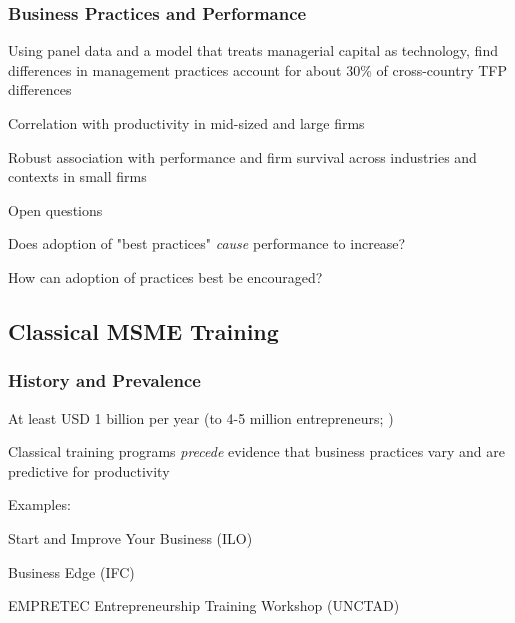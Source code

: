 \documentclass[hideothersubsections, usenames,dvipsnames,11pt]{beamer}
\newenvironment{itemize_2pt}{\itemize\addtolength{\itemsep}{2pt}}{\enditemize}
\begin{document}
\begin{frame}
\frametitle{Business Practices and Performance}
	\begin{itemize_2pt}
	\item Using panel data and a model that treats managerial capital as technology, \citet{Bloom2016} find differences in management practices account for about 30\% of cross-country TFP differences
	\item Correlation with productivity in mid-sized and large firms \citep{Bloom2019}
	\item \textcolor{bdf}{Robust association with performance and firm survival} across industries and contexts in small firms \citep{McKenzie2017}
	\end{itemize_2pt}
	
\vspace{0.1in}	
	
	Open questions
	\begin{itemize_2pt}
		\item Does adoption of "best practices" \emph{cause} performance to increase?
		\item How can adoption of practices best be encouraged?
	\end{itemize_2pt}	
	
\end{frame}


\subsection{Classical MSME Training}

\begin{frame}
\frametitle{History and Prevalence}
	\begin{itemize_2pt}
		\item At least \textcolor{bdf}{USD 1 billion per year} (to 4-5 million entrepreneurs; \citet{McKenzie2021})
		\item Classical training programs \emph{precede} evidence that business practices vary and are predictive for productivity
		
		\vspace{0.5em}		
		
		\item Examples:
		\begin{itemize_2pt}
			\item Start and Improve Your Business (ILO)
			\item Business Edge (IFC)
			\item EMPRETEC Entrepreneurship Training Workshop (UNCTAD)
		\end{itemize_2pt} 
	\end{itemize_2pt}
\end{frame}
\end{document}
